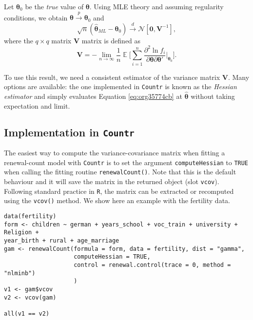 \documentclass[a4paper,twoside,11pt]{article}
\begin{document}
Let \(\bm{\theta}_0\) be the \emph{true} value of \(\bm{\theta}\). Using MLE theory and
assuming regularity conditions, we obtain \(\bm{\hat{\theta}} \xrightarrow{p}
\bm{\theta}_0\) and
\begin{equation}      
     \sqrt{n}(\bm{\hat{\theta}}_{ML} - \bm{\theta}_0) 
     \xrightarrow{d} \mathcal{N}[\mathbf{0}, \mathbf{V}^{-1}] 
     ,
\end{equation}
where the \(q \times q\) matrix \(\mathbf{V}\) matrix is defined as
\begin{equation}      
\label{eq:org35774cb}
     \mathbf{V} 
     = - \lim_{n \rightarrow \infty} \frac{1}{n} \mathop{\mathbb{E}} 
     \bigg[ \sum_{i=1}^n \frac{\partial^2 \ln f_i }{
                               \partial \bm{\theta} \partial \bm{\theta}'}
               \big|_{\bm{\theta}_0} 
     \bigg]
     .
\end{equation}

To use this result, we need a consistent estimator of the variance matrix
\(\mathbf{V}\). Many options are available: the one implemented in \texttt{Countr} is
known as the \emph{Hessian estimator} and simply evaluates Equation \ref{eq:org35774cb} at
\(\bm{\hat{\theta}}\) without taking expectation and limit.

\subsection{Implementation in \texttt{Countr}}
\label{sec:orgbd667ca}
The easiest way to compute the variance-covariance matrix when fitting a
renewal-count model with \texttt{Countr} is to set the argument \texttt{computeHessian} to
\texttt{TRUE} when calling the fitting routine \texttt{renewalCount()}. Note that this is the
default behaviour and it will save the matrix in the returned object (slot
\texttt{vcov}). Following standard practice in \texttt{R}, the matrix can be extracted or
recomputed using the \texttt{vcov()} method. We show here an example with the
fertility data.

\begin{verbatim}
data(fertility)
form <- children ~ german + years_school + voc_train + university + Religion +
year_birth + rural + age_marriage
gam <- renewalCount(formula = form, data = fertility, dist = "gamma",
                    computeHessian = TRUE, 
                    control = renewal.control(trace = 0, method = "nlminb")
                    )
v1 <- gam$vcov
v2 <- vcov(gam)

all(v1 == v2)
\end{verbatim}
\end{document}
